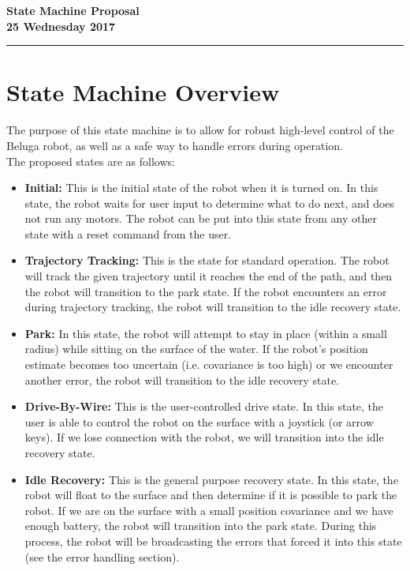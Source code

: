 \documentclass{article}
\begin{document}
\begin{center}
\bf\Large State Machine Proposal \\\smallskip
\rm\normalsize 25 Wednesday 2017
\rule{\textwidth}{1pt}
\end{center}

\section*{State Machine Overview}

The purpose of this state machine is to allow for robust high-level control of the Beluga robot, as well as a safe way to handle errors during operation. \\

\noindent The proposed states are as follows:
\vspace{3pt}
\begin{itemize}[nosep]
\item {\bf Initial:}
  This is the initial state of the robot when it is turned on.
  In this state, the robot waits for user input to determine what to do next, and does not run any motors.
  The robot can be put into this state from any other state with a reset command from the user.
\item {\bf Trajectory Tracking:}
  This is the state for standard operation.
  The robot will track the given trajectory until it reaches the end of the path, and then the robot will transition to the park state.
  If the robot encounters an error during trajectory tracking, the robot will transition to the idle recovery state.
\item {\bf Park:}
  In this state, the robot will attempt to stay in place (within a small radius) while sitting on the surface of the water.
  If the robot's position estimate becomes too uncertain (i.e. covariance is too high) or we encounter another error, the robot will transition to the idle recovery state.
\item {\bf Drive-By-Wire:}
  This is the user-controlled drive state.
  In this state, the user is able to control the robot on the surface with a joystick (or arrow keys).
  If we lose connection with the robot, we will transition into the idle recovery state.
\item {\bf Idle Recovery:}
  This is the general purpose recovery state.
  In this state, the robot will float to the surface and then determine if it is possible to park the robot.
  If we are on the surface with a small position covariance and we have enough battery, the robot will transition into the park state.
  During this process, the robot will be broadcasting the errors that forced it into this state (see the error handling section).
\end{itemize}
\end{document}
